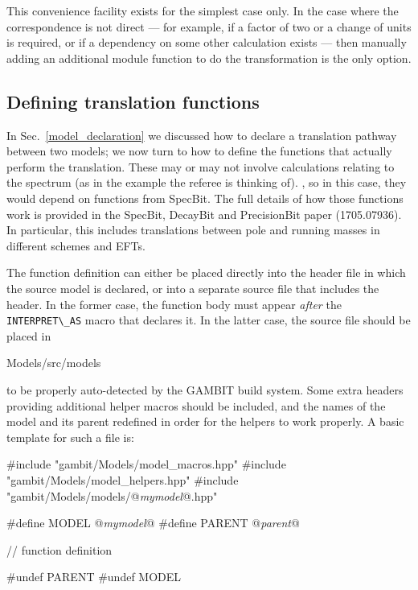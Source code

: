 \documentclass[pdftex,twocolumn,epjc3_preprint,runningheads]{svjour3}
\renewcommand{\_}{\discretionary{\underscore}{}{\underscore}}
\newcommand\cpp[1]{{\lstinline!#1!}}  %
\newcommand{\metavarf}[1]{\textit{\color{darkgreen}\footnotesize\textrm{#1}}}
\newcommand{\metavar}{\metavarf}
\newcommand{\gambit}{\textsf{GAMBIT}\xspace}
\newcommand{\GB}{\gambit}
\begin{document}
This convenience facility exists for the simplest case only. In the case where the correspondence is not direct --- for example, if a factor of two or a change of units is required, or if a dependency on some other calculation exists --- then manually adding an additional module function to do the transformation is the only option.
%
\subsection{Defining translation functions}
\label{model_translation}
%
In Sec.\ \ref{model_declaration} we discussed how to declare a translation pathway between two models; we now turn to how to define the functions that actually perform the translation.  These may or may not involve calculations relating to
the spectrum (as in the example the referee is thinking of). , so in this
case, they would depend on functions from SpecBit. The full details of how
those functions work is provided in the SpecBit, DecayBit and PrecisionBit
paper (1705.07936). In particular, this includes translations between pole and
running masses in different schemes and EFTs.



The function definition can either be placed directly into the header file in which the source model is declared, or into a separate source file that includes the header.  In the former case, the function body must appear \textit{after} the \cpp{INTERPRET\_AS} macro that declares it.  In the latter case, the source file should be placed in
\begin{lstterm}
Models/src/models
\end{lstterm}
to be properly auto-detected by the \GB build system. Some extra headers providing additional helper macros should be included, and the names of the model and its parent redefined in order for the helpers to work properly. A basic template for such a file is:
\begin{lstcpp}
#include "gambit/Models/model_macros.hpp"
#include "gambit/Models/model_helpers.hpp"
#include "gambit/Models/models/@\metavar{my\_model}@.hpp"

#define MODEL  @\metavar{my\_model}@
#define PARENT @\metavar{parent}@

// function definition

#undef PARENT
#undef MODEL
\end{lstcpp}
\end{document}
